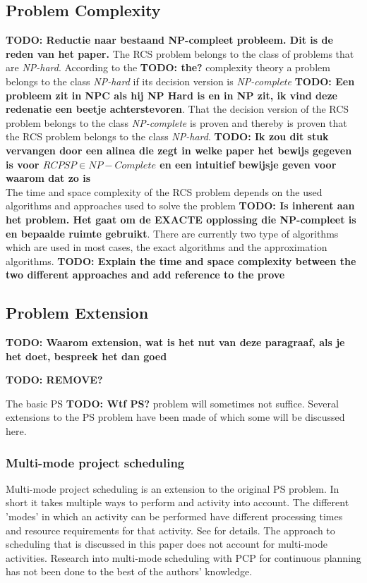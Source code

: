 \documentclass{article}
\newcommand{\TODO}[1]{{\color{red}\textbf{TODO: #1}}}
\begin{document}
\subsection{Problem Complexity}
\TODO{Reductie naar bestaand NP-compleet probleem. Dit is de reden van het paper.}
The RCS problem belongs to the class of problems that are \emph{NP-hard}. According to the \TODO{the?} complexity theory a problem belongs to the class \emph{NP-hard} if its decision version is \emph{NP-complete} \TODO{Een probleem zit in NPC als hij NP Hard is en in NP zit, ik vind deze redenatie een beetje achterstevoren}. 
That the decision version of the RCS problem belongs to the class \emph{NP-complete} is proven and thereby is proven that the RCS problem belongs to the class \emph{NP-hard}. 
\TODO{Ik zou dit stuk vervangen door een alinea die zegt in welke paper het bewijs gegeven is voor $RCPSP \in NP-Complete$ en een intuitief bewijsje geven voor waarom dat zo is}\\
The time and space complexity of the RCS problem depends on the used algorithms and approaches used to solve the problem \TODO{Is inherent aan het problem. Het gaat om de EXACTE opplossing die NP-compleet is en bepaalde ruimte gebruikt}. 
There are currently two type of algorithms which are used in most cases, the exact algorithms and the approximation algorithms.
\TODO{Explain the time and space complexity between the two different approaches and add reference to the prove}

\subsection{Problem Extension}
\TODO{Waarom extension, wat is het nut van deze paragraaf, als je het doet, bespreek het dan goed}

\TODO{REMOVE?}

The basic PS \TODO{Wtf PS?} problem will sometimes not suffice. Several extensions to the PS problem have been made of which some will be discussed here. 

\subsubsection{Multi-mode project scheduling}
Multi-mode project scheduling is an extension to the original PS problem.
In short it takes multiple ways to perform and activity into account.
The different 'modes' in which an activity can be performed have different processing times and resource requirements for that activity.
See \citet{herroelen05} for details.
The approach to scheduling that is discussed in this paper does not account for multi-mode activities.
Research into multi-mode scheduling with PCP for continuous planning has not been done to the best of the authors' knowledge. 
\end{document}
